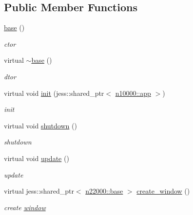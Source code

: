 \subsection*{Public Member Functions}
\begin{DoxyCompactItemize}
\item 
\hyperlink{classnebula_1_1platform_1_1platform_1_1lin_1_1base_a38e8ff4fedc0399fc7468a996e35980d}{base} ()
\begin{DoxyCompactList}\small\item\em ctor \item\end{DoxyCompactList}\item 
virtual \hyperlink{classnebula_1_1platform_1_1platform_1_1lin_1_1base_ad8bab5e66dd9f92205ec2585c49df4e0}{$\sim$base} ()
\begin{DoxyCompactList}\small\item\em dtor \item\end{DoxyCompactList}\item 
virtual void \hyperlink{classnebula_1_1platform_1_1platform_1_1lin_1_1base_af6aec1ac7ee95afb45b83d110cd0c1f0}{init} (jess::shared\_\-ptr$<$ \hyperlink{classnebula_1_1framework_1_1app}{n10000::app} $>$)
\begin{DoxyCompactList}\small\item\em init \item\end{DoxyCompactList}\item 
virtual void \hyperlink{classnebula_1_1platform_1_1platform_1_1lin_1_1base_a524f2d600ae0297bab511783657b33b0}{shutdown} ()
\begin{DoxyCompactList}\small\item\em shutdown \item\end{DoxyCompactList}\item 
virtual void \hyperlink{classnebula_1_1platform_1_1platform_1_1lin_1_1base_a2c85fc5372d292e5c79df69d07aefcd1}{update} ()
\begin{DoxyCompactList}\small\item\em update \item\end{DoxyCompactList}\item 
virtual jess::shared\_\-ptr$<$ \hyperlink{classnebula_1_1platform_1_1window_1_1base}{n22000::base} $>$ \hyperlink{classnebula_1_1platform_1_1platform_1_1lin_1_1base_a2edb327fb68f9198ec048d9902dddb3b}{create\_\-window} ()
\begin{DoxyCompactList}\small\item\em create \hyperlink{namespacenebula_1_1platform_1_1window}{window} \item\end{DoxyCompactList}\end{DoxyCompactItemize}
